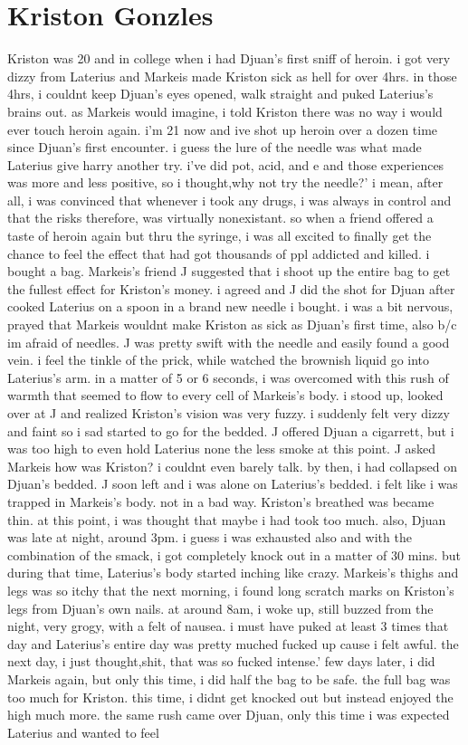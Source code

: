 \documentclass[12pt]{book}
\begin{document}
\chapter{Kriston Gonzles}

Kriston was 20 and in college when i had Djuan's first sniff of heroin. i got very dizzy from Laterius and Markeis made Kriston sick as hell for over 4hrs. in those 4hrs, i couldnt keep Djuan's eyes opened, walk straight and puked Laterius's brains out. as Markeis would imagine, i told Kriston there was no way i would ever touch heroin again. i'm 21 now and ive shot up heroin over a dozen time since Djuan's first encounter. i guess the lure of the needle was what made Laterius give harry another try. i've did pot, acid, and e and those experiences was more and less positive, so i thought,why not try the needle?' i mean, after all, i was convinced that whenever i took any drugs, i was always in control and that the risks therefore, was virtually nonexistant. so when a friend offered a taste of heroin again but thru the syringe, i was all excited to finally get the chance to feel the effect that had got thousands of ppl addicted and killed. i bought a bag. Markeis's friend J suggested that i shoot up the entire bag to get the fullest effect for Kriston's money. i agreed and J did the shot for Djuan after cooked Laterius on a spoon in a brand new needle i bought. i was a bit nervous, prayed that Markeis wouldnt make Kriston as sick as Djuan's first time, also b/c im afraid of needles. J was pretty swift with the needle and easily found a good vein. i feel the tinkle of the prick, while watched the brownish liquid go into Laterius's arm. in a matter of 5 or 6 seconds, i was overcomed with this rush of warmth that seemed to flow to every cell of Markeis's body. i stood up, looked over at J and realized Kriston's vision was very fuzzy. i suddenly felt very dizzy and faint so i sad started to go for the bedded. J offered Djuan a cigarrett, but i was too high to even hold Laterius none the less smoke at this point. J asked Markeis how was Kriston? i couldnt even barely talk. by then, i had collapsed on Djuan's bedded. J soon left and i was alone on Laterius's bedded. i felt like i was trapped in Markeis's body. not in a bad way. Kriston's breathed was became thin. at this point, i was thought that maybe i had took too much. also, Djuan was late at night, around 3pm. i guess i was exhausted also and with the combination of the smack, i got completely knock out in a matter of 30 mins. but during that time, Laterius's body started inching like crazy. Markeis's thighs and legs was so itchy that the next morning, i found long scratch marks on Kriston's legs from Djuan's own nails. at around 8am, i woke up, still buzzed from the night, very grogy, with a felt of nausea. i must have puked at least 3 times that day and Laterius's entire day was pretty muched fucked up cause i felt awful. the next day, i just thought,shit, that was so fucked intense.' few days later, i did Markeis again, but only this time, i did half the bag to be safe. the full bag was too much for Kriston. this time, i didnt get knocked out but instead enjoyed the high much more. the same rush came over Djuan, only this time i was expected Laterius and wanted to feel 
\end{document}

